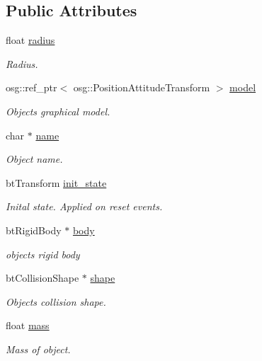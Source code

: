 \subsection*{Public Attributes}
\begin{DoxyCompactItemize}
\item 
float \hyperlink{classbtosgSphere_afd570c85e9ce1b15b2b4b378e4f6abeb}{radius}
\begin{DoxyCompactList}\small\item\em Radius. \end{DoxyCompactList}\item 
osg\+::ref\+\_\+ptr$<$ osg\+::\+Position\+Attitude\+Transform $>$ \hyperlink{classbtosgObject_afd15726e7a214212d6d5815f8ac1ac6c}{model}
\begin{DoxyCompactList}\small\item\em Object\textquotesingle{}s graphical model. \end{DoxyCompactList}\item 
char $\ast$ \hyperlink{classbtosgObject_a12396e1362797a75473a2e833b579cc9}{name}
\begin{DoxyCompactList}\small\item\em Object name. \end{DoxyCompactList}\item 
bt\+Transform \hyperlink{classbtosgObject_a2dee023f311114e200df9b04c8c1b400}{init\+\_\+state}
\begin{DoxyCompactList}\small\item\em Inital state. Applied on reset events. \end{DoxyCompactList}\item 
bt\+Rigid\+Body $\ast$ \hyperlink{classbtosgObject_a64ccde0543c184ed1749fdb9c9699785}{body}
\begin{DoxyCompactList}\small\item\em object\textquotesingle{}s rigid body \end{DoxyCompactList}\item 
bt\+Collision\+Shape $\ast$ \hyperlink{classbtosgObject_a0f6a8da01cf643c321bffe86e42604b0}{shape}
\begin{DoxyCompactList}\small\item\em Object\textquotesingle{}s collision shape. \end{DoxyCompactList}\item 
float \hyperlink{classbtosgObject_a2418bb2194d5e9b0f1c51c84672ba7d1}{mass}
\begin{DoxyCompactList}\small\item\em Mass of object. \end{DoxyCompactList}\end{DoxyCompactItemize}


